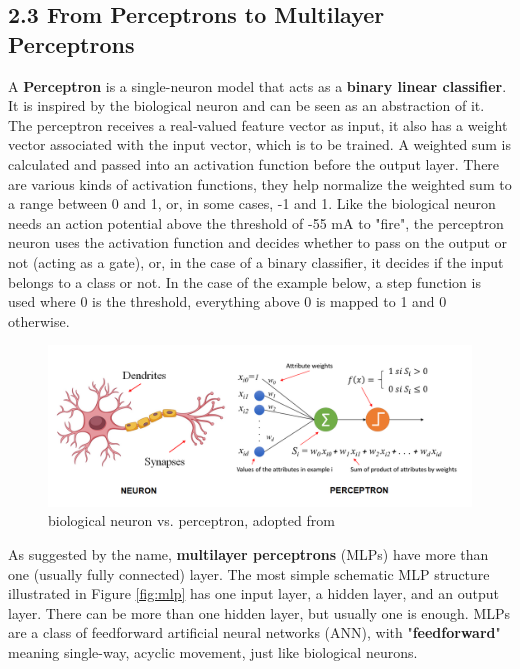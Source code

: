 \documentclass[nobib]{tufte-handout}
\begin{document}
\subsection{2.3 \textbf{From Perceptrons to Multilayer Perceptrons}}

A \textbf{Perceptron} is a single-neuron model that acts as a \textbf{binary linear classifier}. It is inspired by the biological neuron and can be seen as an abstraction of it. The perceptron receives a real-valued feature vector as input, it also has a weight vector associated with the input vector, which is to be trained. A weighted sum is calculated and passed into an activation function before the output layer. There are various kinds of activation functions, they help normalize the weighted sum to a range between 0 and 1, or, in some cases, -1 and 1. Like the biological neuron needs an action potential above the threshold of -55 mA to "fire", the perceptron neuron uses the activation function and decides whether to pass on the output or not (acting as a gate), or, in the case of a binary classifier, it decides if the input belongs to a class or not. In the case of the example below, a step function is used where 0 is the threshold, everything above 0 is mapped to 1 and 0 otherwise. \\
\begin{figure}[h!]
  \centering
  \includegraphics{perceptron1.png}
  \caption{biological neuron vs. perceptron, adopted from \cite{IF:perceptron}}
\end{figure}
As suggested by the name, \textbf{multilayer perceptrons} (MLPs) have more than one (usually fully connected) layer. The most simple schematic MLP structure illustrated in Figure \ref{fig:mlp} has one input layer, a hidden layer, and an output layer. There can be more than one hidden layer, but usually one is enough. MLPs are a class of feedforward artificial neural networks (ANN), with "\textbf{feedforward}" meaning single-way, acyclic movement, just like biological neurons.\\ 
\end{document}

